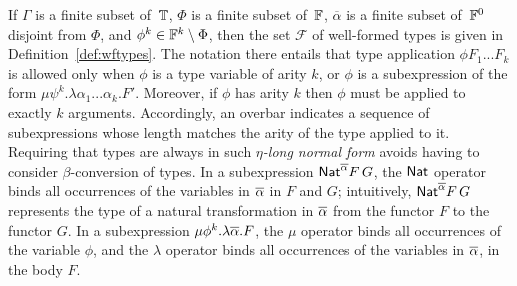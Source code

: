 \documentclass[runningheads]{llncs}
\newcommand{\F}{\mathcal{F}}
\begin{document}
If $\Gamma$ is a finite subset of\, $\mathbb{T}$, $\Phi$ is a finite
subset of\, $\mathbb{F}$, $\overline{\alpha}$ is a finite subset of\,
$\mathbb{F}^0$ disjoint from $\Phi$, and $\phi^k \in \mathbb{F}^k \setminus
\Phi$, then the set $\F$ of well-formed types is given in
Definition~\ref{def:wftypes}.  The notation there entails that type
application $\phi F_1...F_k$ is allowed only when $\phi$ is a type
variable of arity $k$, or $\phi$ is a subexpression of the form $\mu
\psi^{k}.\lambda \alpha_1...\alpha_k.F'$. Moreover, if $\phi$ has
arity $k$ then $\phi$ must be applied to exactly $k$ arguments.
Accordingly, an overbar indicates a sequence of subexpressions whose
length matches the arity of the type applied to it. Requiring that
types are always in such \emph{$\eta$-long normal form} avoids having
to consider $\beta$-conversion of types. In a subexpression
$\mathsf{Nat}^{\overline{\alpha}}F\,G$, the $\mathsf{Nat}$ operator binds all occurrences of
the variables in $\overline{\alpha}$ in $F$ and $G$; intuitively, $\mathsf{Nat}^{\overline{\alpha}}F\,G$ represents the type of a natural transformation in $\overline{\alpha}$ from the functor $F$ to the functor $G$.  In a subexpression
$\mu \phi^k.\lambda \overline{\alpha}.F$, the $\mu$ operator binds all
occurrences of the variable $\phi$, and the $\lambda$ operator binds
all occurrences of the variables in $\overline{\alpha}$, in the body $F$.
\end{document}
